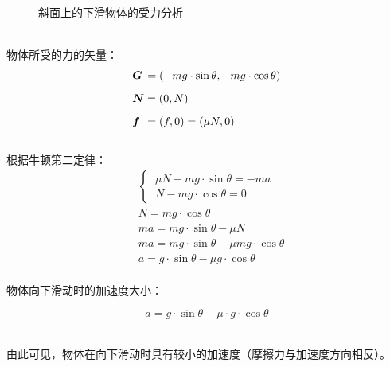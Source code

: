 \documentclass[UTF8]{ctexart}
\newcommand*{\veb}[1]{\vb*{#1}}
\begin{document}
\begin{figure}[h]
\begin{center}
            \caption{斜面上的下滑物体的受力分析}
        \end{center}
    \end{figure}\\
    物体所受的力的矢量：
    \begin{align}
        &\veb{G}\hspace{2.0pt}=(-mg\cdot\sin{\theta},-mg\cdot\cos{\theta})\\[2mm]
        &\veb{N}=(0,N)\\[2mm]
        &\veb{f}\hspace{4.0pt}=(f,0)=(\mu N,0)
    \end{align}\\
    根据牛顿第二定律：
    \begin{align}
        &\begin{cases}
            ~\mu N-mg\cdot\sin{\theta}=-ma\\[1mm]
            ~N-mg\cdot\cos{\theta}=0
        \end{cases}\\[2mm]
        &N=mg\cdot\cos{\theta}\\[2mm]
        &ma=mg\cdot\sin{\theta}-\mu N\\[2mm]
        &ma=mg\cdot\sin{\theta}-\mu mg\cdot\cos{\theta}\\[2mm]
        &a=g\cdot\sin{\theta}-\mu g\cdot\cos{\theta}
    \end{align}\\
    物体向下滑动时的加速度大小：
    \begin{large}
        \begin{equation*}
            a=g\cdot\sin{\theta}-\mu\cdot g\cdot \cos{\theta}
        \end{equation*}
    \end{large}\\
    由此可见，物体在向下滑动时具有较小的加速度（摩擦力与加速度方向相反）。
\end{document}
